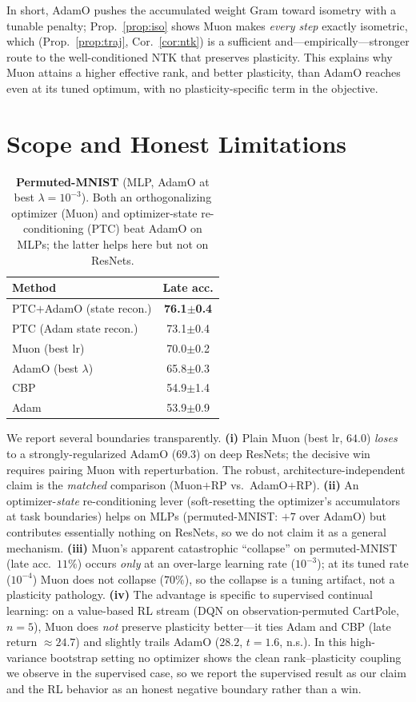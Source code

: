 \documentclass[letterpaper,twocolumn,10pt]{article}
\begin{document}
In short, AdamO pushes the accumulated weight Gram toward isometry with a tunable penalty; Prop.~\ref{prop:iso} shows Muon makes \emph{every step} exactly isometric, which (Prop.~\ref{prop:traj}, Cor.~\ref{cor:ntk}) is a sufficient and---empirically---stronger route to the well-conditioned NTK that preserves plasticity. This explains why Muon attains a higher effective rank, and better plasticity, than AdamO reaches even at its tuned optimum, with no plasticity-specific term in the objective.

\section{Scope and Honest Limitations}\label{sec:scope}
\begin{table}[t]\centering\small
\caption{\textbf{Permuted-MNIST} (MLP, AdamO at best $\lambda{=}10^{-3}$). Both an orthogonalizing optimizer (Muon) and optimizer-state re-conditioning (PTC) beat AdamO on MLPs; the latter helps here but not on ResNets.}
\label{tab:pmnist}
\begin{tabular}{lc}
\toprule
Method & Late acc. \\
\midrule
PTC$+$AdamO (state recon.) & \textbf{76.1$\pm$0.4} \\
PTC (Adam state recon.) & 73.1$\pm$0.4 \\
Muon (best lr) & 70.0$\pm$0.2 \\
AdamO (best $\lambda$) & 65.8$\pm$0.3 \\
CBP & 54.9$\pm$1.4 \\
Adam & 53.9$\pm$0.9 \\
\bottomrule
\end{tabular}
\end{table}
We report several boundaries transparently. \textbf{(i)} Plain Muon (best lr, $64.0$) \emph{loses} to a strongly-regularized AdamO ($69.3$) on deep ResNets; the decisive win requires pairing Muon with reperturbation. The robust, architecture-independent claim is the \emph{matched} comparison (Muon$+$RP vs.\ AdamO$+$RP). \textbf{(ii)} An optimizer-\emph{state} re-conditioning lever (soft-resetting the optimizer's accumulators at task boundaries) helps on MLPs (permuted-MNIST: $+7$ over AdamO) but contributes essentially nothing on ResNets, so we do not claim it as a general mechanism. \textbf{(iii)} Muon's apparent catastrophic ``collapse'' on permuted-MNIST (late acc.\ $11\%$) occurs \emph{only} at an over-large learning rate ($10^{-3}$); at its tuned rate ($10^{-4}$) Muon does not collapse ($70\%$), so the collapse is a tuning artifact, not a plasticity pathology. \textbf{(iv)} The advantage is specific to supervised continual learning: on a value-based RL stream (DQN on observation-permuted CartPole, $n{=}5$), Muon does \emph{not} preserve plasticity better---it ties Adam and CBP (late return ${\approx}24.7$) and slightly trails AdamO ($28.2$, $t{=}1.6$, n.s.). In this high-variance bootstrap setting no optimizer shows the clean rank--plasticity coupling we observe in the supervised case, so we report the supervised result as our claim and the RL behavior as an honest negative boundary rather than a win.
\end{document}
